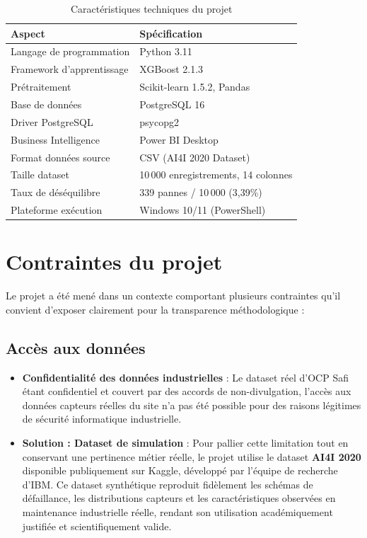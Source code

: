 \documentclass[a4paper,12pt,twoside]{report}
\begin{document}
\begin{table}[H]
\centering
\small
\caption{Caractéristiques techniques du projet}
\begin{tabular}{|l|l|}
\hline
\textbf{Aspect} & \textbf{Spécification} \\
\hline\hline
Langage de programmation & Python 3.11 \\
\hline
Framework d'apprentissage & XGBoost 2.1.3 \\
\hline
Prétraitement & Scikit-learn 1.5.2, Pandas \\
\hline
Base de données & PostgreSQL 16 \\
\hline
Driver PostgreSQL & psycopg2 \\
\hline
Business Intelligence & Power BI Desktop \\
\hline
Format données source & CSV (AI4I 2020 Dataset) \\
\hline
Taille dataset & 10\,000 enregistrements, 14 colonnes \\
\hline
Taux de déséquilibre & 339 pannes / 10\,000 (3,39\%) \\
\hline
Plateforme exécution & Windows 10/11 (PowerShell) \\
\hline
\end{tabular}
\end{table}

\section{Contraintes du projet}

Le projet a été mené dans un contexte comportant plusieurs contraintes qu'il convient d'exposer clairement pour la transparence méthodologique :

\subsection{Accès aux données}

\begin{itemize}
    \item \textbf{Confidentialité des données industrielles} : Le dataset réel d'OCP Safi étant confidentiel et couvert par des accords de non-divulgation, l'accès aux données capteurs réelles du site n'a pas été possible pour des raisons légitimes de sécurité informatique industrielle.
    
    \item \textbf{Solution : Dataset de simulation} : Pour pallier cette limitation tout en conservant une pertinence métier réelle, le projet utilise le dataset \textbf{AI4I 2020} disponible publiquement sur Kaggle, développé par l'équipe de recherche d'IBM. Ce dataset synthétique reproduit fidèlement les schémas de défaillance, les distributions capteurs et les caractéristiques observées en maintenance industrielle réelle, rendant son utilisation académiquement justifiée et scientifiquement valide.
\end{itemize}
\end{document}
